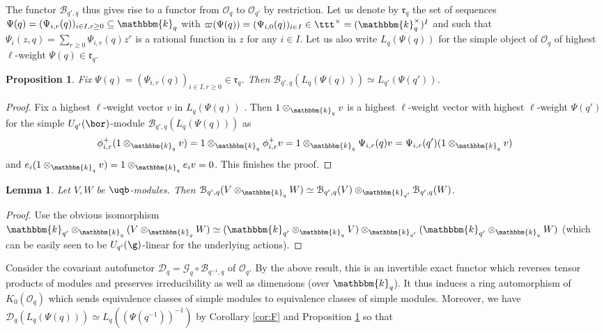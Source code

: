 \documentclass[11pt]{amsart}
\newtheorem{lem}[theorem]{Lemma}
\newtheorem{prop}[theorem]{Proposition}
\theoremstyle{definition}
\theoremstyle{remark}
\numberwithin{equation}{section}
\begin{document}
The functor $\mathcal{B}_{q',q}$ thus gives rise to a functor from $\mathcal{O}_q$ to $\mathcal{O}_{q'}$ by restriction. Let us denote by $\mathfrak{r}_q$ the set of sequences $\Psi(q) = (\Psi_{i,r}(q))_{i\in I,r\geq 0}\subseteq\mathbbm{k}_q$ with $\varpi(\Psi(q))=(\Psi_{i,0}(q))_{i\in I} \in \ttt^{\times} = (\mathbbm{k}_q^{\times})^I$ and such that $\Psi_{i}(z,q) = \sum_{r\geq 0}\Psi_{i,r}(q)z^r$ is a rational function in $z$ for any $i\in I$.
Let us also write $L_q(\Psi(q))$ for the simple object of $\mathcal{O}_q$ of highest $\ell$-weight $\Psi(q)\in \mathfrak{r}_q$.
\begin{prop}\label{prop:B} Fix $\Psi(q)=(\Psi_{i,r}(q))_{i\in I,r\geq 0}\in\mathfrak{r}_q$. Then $\mathcal{B}_{q',q}(L_q(\Psi(q))) \simeq L_{q'}(\Psi(q'))$.
\end{prop}
\begin{proof} Fix a highest $\ell$-weight vector $v$ in $L_q(\Psi(q))$ . Then $1\otimes_{\mathbbm{k}_q}v$ is a highest $\ell$-weight vector with highest $\ell$-weight $\Psi(q')$ for the simple $U_{q'}(\bor)$-module $\mathcal{B}_{q',q}(L_q(\Psi(q)))$ as 
$$\phi_{i,r}^+(1\otimes_{\mathbbm{k}_q}v) = 1\otimes_{\mathbbm{k}_q}\phi_{i,r}^+v = 1\otimes_{\mathbbm{k}_q}\Psi_{i,r}(q)v = \Psi_{i,r}(q')(1\otimes_{\mathbbm{k}_q}v)$$ 
and $e_i(1\otimes_{\mathbbm{k}_q}v)=1\otimes_{\mathbbm{k}_q}e_iv=0$. This finishes the proof.
\end{proof}
\begin{lem} Let $V,W$ be $\uqb$-modules. Then $\mathcal{B}_{q',q}(V\otimes_{\mathbbm{k}_{q}} W) \simeq \mathcal{B}_{q',q}(V)\otimes_{\mathbbm{k}_{q'}} \mathcal{B}_{q',q}(W)$.
\end{lem}
\begin{proof} Use the obvious isomorphism $\mathbbm{k}_{q'}\otimes_{\mathbbm{k}_{q}} (V\otimes_{\mathbbm{k}_{q}} W) \simeq (\mathbbm{k}_{q'}\otimes_{\mathbbm{k}_{q}} V)\otimes_{\mathbbm{k}_{q'}}(\mathbbm{k}_{q'}\otimes_{\mathbbm{k}_{q}} W)$ (which can be easily seen to be $U_{q'}(\g)$-linear for the underlying actions).
\end{proof}
Consider the covariant autofunctor $\mathcal{D}_{q} = \mathcal{G}_q \circ \mathcal{B}_{q^{-1},q}$ of $\mathcal{O}_q$. By the above result, this is an invertible exact functor which reverses tensor products of modules and preserves irreducibility as well as dimensions (over $\mathbbm{k}_q$). It thus induces a ring automorphism of $K_0(\mathcal{O}_q)$ which sends equivalence classes of simple modules to equivalence classes of simple modules. Moreover, we have $\mathcal{D}_{q}(L_q(\Psi(q))) \simeq L_q((\Psi(q^{-1}))^{-1})$ by Corollary \ref{cor:F} and Proposition \ref{prop:B} so that 
\end{document}
